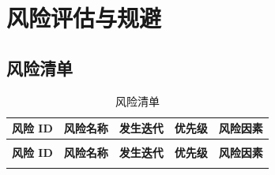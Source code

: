 \section{风险评估与规避}

\subsection{风险清单}

\begin{longtable}{>{\centering\arraybackslash}m{1cm} >{\centering\arraybackslash}m{3cm} >{\centering\arraybackslash}m{1cm} >{\centering\arraybackslash}m{1.5cm} >{\centering\arraybackslash}m{7cm}}

    \caption{风险清单} \label{tab:training}                                                                                                 \\

    \toprule
    \textbf{风险 ID} & \textbf{风险名称}        & \textbf{发生迭代} & \textbf{优先级} & \textbf{风险因素}                                                \\
    \midrule
    \endfirsthead

    \multicolumn{5}{c}{{\tablename\ \thetable{} 续表}}                                                                                    \\
    \toprule
    \textbf{风险 ID} & \textbf{风险名称}        & \textbf{发生迭代} & \textbf{优先级} & \textbf{风险因素}                                                \\
    \midrule
    \endhead

    \bottomrule
    \endfoot



\end{longtable}
